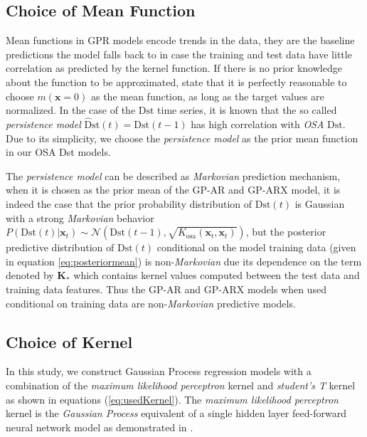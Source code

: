 \subsection{Choice of Mean Function}

Mean functions in GPR models encode trends in the data, they are the baseline predictions the model falls back to in case the training and test data have little correlation as predicted by the kernel function. If there is no prior knowledge about the function to be approximated, \citet{Rasmussen:2005:GPM:1162254} state that it is perfectly reasonable to choose $ m(\mathbf{x} = 0)$ as the mean function, as long as the target values are normalized. In the case of the $\mathrm{Dst}$ time series, it is known that the so called \emph{persistence model} 
$\mathrm{\hat{D}st}(t) = \mathrm{Dst}(t-1)$ has high correlation with \emph{OSA} $\mathrm{Dst}$. Due to its simplicity, we choose the \emph{persistence model} as the prior mean function in our OSA Dst models. 

The \emph{persistence model} can be described as \emph{Markovian} prediction mechanism, when it is chosen as the prior mean of the GP-AR and GP-ARX model, it is indeed the case that the prior probability distribution of $ \mathrm{Dst}(t)$ is Gaussian with a strong \emph{Markovian} behavior $P(\mathrm{Dst}(t)|\mathbf{x}_t) \sim \mathcal{N}(\mathrm{Dst}(t-1), \sqrt{K_{\text{osa}}(\mathbf{x}_t, \mathbf{x}_t)})$, but the posterior predictive distribution of $\mathrm{Dst}(t)$ conditional on the model training data (given in equation \ref{eq:posteriormean}) is non-\emph{Markovian} due its dependence on the term denoted by $\mathbf{K}_{*}$ which contains kernel values computed between the test data and training data features. Thus the GP-AR and GP-ARX models when used conditional on training data are non-\emph{Markovian} predictive models.

\subsection{Choice of Kernel}

In this study, we construct Gaussian Process regression models with a combination of the \emph{maximum likelihood perceptron} kernel and \emph{student's T} kernel as shown in equations (\ref{eq:usedKernel}). The \emph{maximum likelihood perceptron} kernel is the \emph{Gaussian Process} equivalent of a single hidden layer feed-forward neural network model as demonstrated in \citet{Neal:1996:BLN:525544}.

